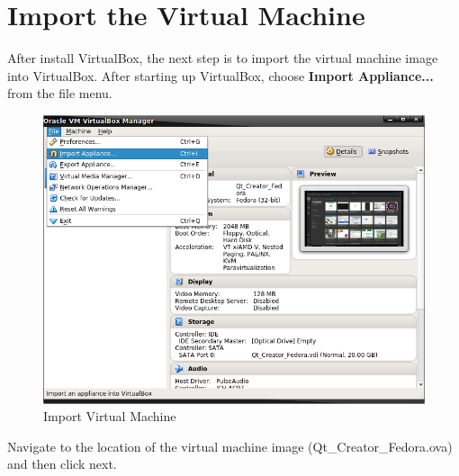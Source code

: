 \documentclass{article}
\begin{document}
\section{Import the Virtual Machine}

After install VirtualBox, the next step is to import the virtual machine image into VirtualBox. After starting up VirtualBox, choose \textbf{Import Appliance...} from the file menu.

	\begin{figure}[H]
		\centering
		\includegraphics[scale=0.35]{pics/VirtualBox_Import_Appliance.png}
		\caption{Import Virtual Machine}
		\label{Import_Virtual_Machine}
	\end{figure}


Navigate to the location of the virtual machine image (Qt\_Creator\_Fedora.ova) and then click next. 
\end{document}
